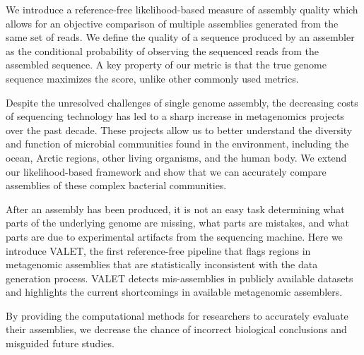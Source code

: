 
We introduce a reference-free likelihood-based measure of assembly quality which allows for an objective comparison of multiple assemblies generated from the same set of reads. We define the quality of a sequence produced by an assembler as the conditional probability of observing the sequenced reads from the assembled sequence. A key property of our metric is that the true genome sequence maximizes the score, unlike other commonly used metrics.

Despite the unresolved challenges of single genome assembly, the decreasing costs of sequencing technology has led to a sharp increase in metagenomics projects over the past decade.
These projects allow us to better understand the diversity and function of microbial communities found in the environment, including the ocean, Arctic regions, other living organisms, and the human body.
We extend our likelihood-based framework and show that we can accurately compare assemblies of these complex bacterial communities.



After an assembly has been produced, it is not an easy task determining what parts of the underlying genome are missing, what parts are mistakes, and what parts are due to experimental artifacts from the sequencing machine.
Here we introduce VALET, the first reference-free pipeline that flags regions in metagenomic assemblies that are statistically inconsistent with the data generation process.
VALET detects mis-assemblies in publicly available datasets and highlights the current shortcomings in available metagenomic assemblers.

By providing the computational methods for researchers to accurately evaluate their assemblies, we decrease the chance of incorrect biological conclusions and misguided future studies.


